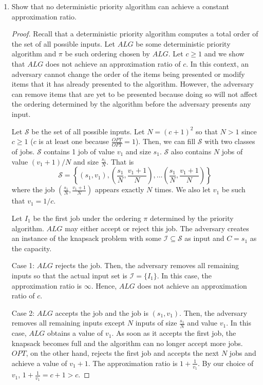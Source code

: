 \documentclass[11pt]{article}
\begin{document}
\begin{enumerate}[leftmargin=16pt]
\begin{enumerate}[leftmargin=16pt]
        \item Show that no deterministic priority algorithm can achieve a constant approximation ratio.
        \begin{proof}
            Recall that a deterministic priority algorithm computes a total order of the set of all possible inputs. Let $ALG$ be some deterministic priority algorithm and $\pi$ be such ordering chosen by $ALG$. Let $c \geq 1$ and we show that $ALG$ does not achieve an approximation ratio of $c$. In this context, an adversary cannot change the order of the items being presented or modify items that it has already presented to the algorithm. However, the adversary can remove items that are yet to be presented because doing so will not affect the ordering determined by the algorithm before the adversary presents any input.

            Let $\mathcal{S}$ be the set of all possible inputs. Let $N = (c+1)^2$ so that $N > 1$ since $c \geq 1$ ($c$ is at least one because $\frac{OPT}{OPT} = 1$). Then, we can fill $\mathcal{S}$ with two classes of jobs. $\mathcal{S}$ contains 1 job of value $v_1$ and size $s_1$. $\mathcal{S}$ also contains $N$ jobs of value $(v_1+1)/N$ and size $\frac{s_1}{N}$. That is
            $$
            \mathcal{S} = \left\{(s_1,v_1), \left(\frac{s_1}{N}, \frac{v_1+1}{N}\right), \ldots \left(\frac{s_1}{N},\frac{v_1+1}{N}\right)\right\}
            $$
            where the job $(\frac{s_1}{N},\frac{v_1+1}{N})$ appears exactly $N$ times. We also let $v_1$ be such that $v_1 = 1/c$. 
            
            Let $I_1$ be the first job under the ordering $\pi$ determined by the priority algorithm. $ALG$ may either accept or reject this job. The adversary creates an instance of the knapsack problem with some $\mathcal{I} \subseteq \mathcal{S}$ as input and $C = s_1$ as the capacity. 

            Case 1: $ALG$ rejects the job. Then, the adversary removes all remaining inputs so that the actual input set is $\mathcal{I} = \{I_1\}$. In this case, the approximation ratio is $\infty$. Hence, $ALG$ does not achieve an approximation ratio of $c$.

            Case 2: $ALG$ accepts the job and the job is $(s_1,v_1)$. Then, the adversary removes all remaining inputs except $N$ inputs of size $\frac{s_1}{N}$ and value $v_1$. In this case, $ALG$ obtains a value of $v_1$. As soon as it accepts the first job, the knapsack becomes full and the algorithm can no longer accept more jobs. $OPT$, on the other hand, rejects the first job and accepts the next $N$ jobs and achieve a value of $v_1 + 1$. The approximation ratio is $1+\frac{1}{v_1}$. By our choice of $v_1$, $1 + \frac{1}{v_1} = c+1 > c$.
            

\end{proof}
\end{enumerate}
\end{enumerate}
\end{document}

